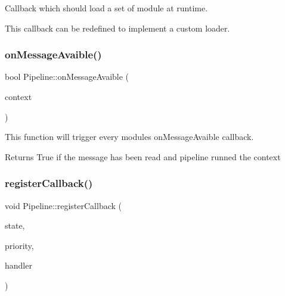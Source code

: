 Callback which should load a set of module at runtime. 

This callback can be redefined to implement a custom loader. \mbox{\label{classo_z_1_1_pipeline_a5dc5181a699312bc35384ad706668e3c}} 
\subsubsection{\texorpdfstring{onMessageAvaible()}{onMessageAvaible()}}
{\footnotesize\ttfamily bool Pipeline\+::on\+Message\+Avaible (\begin{DoxyParamCaption}\item[{\mbox{\hyperlink{classo_z_1_1_context}{Context}} \&}]{context }\end{DoxyParamCaption})\hspace{0.3cm}{\ttfamily [virtual]}}



This function will trigger every module\textquotesingle{}s \textquotesingle{}on\+Message\+Avaible\textquotesingle{} callback. 

\begin{DoxyReturn}{Returns}
True if the message has been read and pipeline runned the context 
\end{DoxyReturn}
\mbox{\label{classo_z_1_1_pipeline_a869b02b2b8953993ccfb882a3e1f3a0f}} 
\subsubsection{\texorpdfstring{registerCallback()}{registerCallback()}\hspace{0.1cm}{\footnotesize\ttfamily [1/2]}}
{\footnotesize\ttfamily void Pipeline\+::register\+Callback (\begin{DoxyParamCaption}\item[{\mbox{\hyperlink{namespaceo_z_a356b278f7c65def0cae75fca8cae268e}{State}}}]{state,  }\item[{\mbox{\hyperlink{namespaceo_z_af05a92eb185d18369e9b4acdcd9dcd12}{Priority}}}]{priority,  }\item[{\mbox{\hyperlink{classo_z_1_1_pipeline_a5a71ea2f2d4be5b82589c1b8175722f4}{Callback\+Handler}} \&\&}]{handler }\end{DoxyParamCaption})}



